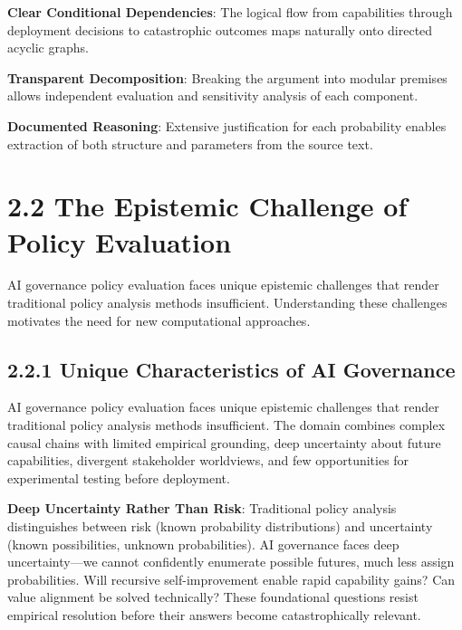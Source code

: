 \documentclass[
  11pt,
  letterpaper,
]{book}
\begin{document}
\textbf{Clear Conditional Dependencies}: The logical flow from
capabilities through deployment decisions to catastrophic outcomes maps
naturally onto directed acyclic graphs.

\textbf{Transparent Decomposition}: Breaking the argument into modular
premises allows independent evaluation and sensitivity analysis of each
component.

\textbf{Documented Reasoning}: Extensive justification for each
probability enables extraction of both structure and parameters from the
source text.

\textcite{christiano2019}

\section*{2.2 The Epistemic Challenge of Policy
Evaluation}\label{sec-epistemic-challenge}


AI governance policy evaluation faces unique epistemic challenges that
render traditional policy analysis methods insufficient. Understanding
these challenges motivates the need for new computational approaches.

\subsection*{2.2.1 Unique Characteristics of AI
Governance}\label{sec-ai-governance-unique}

AI governance policy evaluation faces unique epistemic challenges that
render traditional policy analysis methods insufficient. The domain
combines complex causal chains with limited empirical grounding, deep
uncertainty about future capabilities, divergent stakeholder worldviews,
and few opportunities for experimental testing before deployment.

\textbf{Deep Uncertainty Rather Than Risk}: Traditional policy analysis
distinguishes between risk (known probability distributions) and
uncertainty (known possibilities, unknown probabilities). AI governance
faces deep uncertainty---we cannot confidently enumerate possible
futures, much less assign probabilities. Will recursive self-improvement
enable rapid capability gains? Can value alignment be solved
technically? These foundational questions resist empirical resolution
before their answers become catastrophically relevant.
\end{document}
